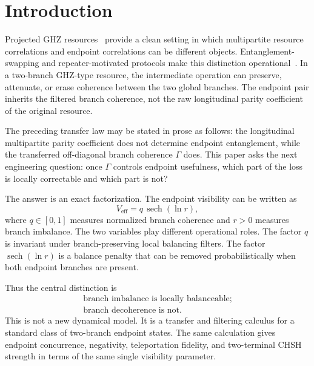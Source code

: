 \documentclass[reprint,aps,pra,superscriptaddress,nofootinbib,longbibliography]{revtex4-2}
\newcommand{\sech}{\operatorname{sech}}
\newcommand{\Veff}{V_{\mathrm{eff}}}
\begin{document}
\section{Introduction}

Projected GHZ resources~\cite{GHZ1989,Mermin1990} provide a clean setting in which multipartite resource correlations and endpoint correlations can be different objects.  Entanglement-swapping and repeater-motivated protocols make this distinction operational~\cite{Zukowski1993,Briegel1998,Kimble2008}.  In a two-branch GHZ-type resource, the intermediate operation can preserve, attenuate, or erase coherence between the two global branches.  The endpoint pair inherits the filtered branch coherence, not the raw longitudinal parity coefficient of the original resource.

The preceding transfer law may be stated in prose as follows: the longitudinal multipartite parity coefficient does not determine endpoint entanglement, while the transferred off-diagonal branch coherence \(\Gamma\) does.  This paper asks the next engineering question: once \(\Gamma\) controls endpoint usefulness, which part of the loss is locally correctable and which part is not?

The answer is an exact factorization.  The endpoint visibility can be written as
\begin{equation}
\Veff=q\,\sech(\ln r),
\label{eq:main-factorization-intro}
\end{equation}
where \(q\in[0,1]\) measures normalized branch coherence and \(r>0\) measures branch imbalance.  The two variables play different operational roles.  The factor \(q\) is invariant under branch-preserving local balancing filters.  The factor \(\sech(\ln r)\) is a balance penalty that can be removed probabilistically when both endpoint branches are present.

Thus the central distinction is
\begin{equation}
\boxed{\begin{gathered}
\text{branch imbalance is locally balanceable;}\\
\text{branch decoherence is not.}
\end{gathered}}
\end{equation}
This is not a new dynamical model.  It is a transfer and filtering calculus for a standard class of two-branch endpoint states.  The same calculation gives endpoint concurrence, negativity, teleportation fidelity, and two-terminal CHSH strength in terms of the same single visibility parameter.
\end{document}
